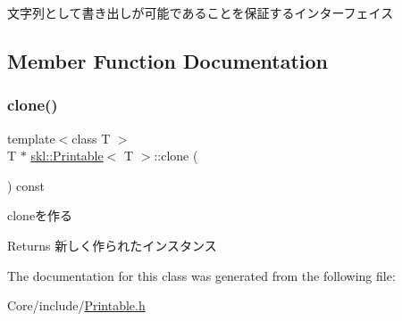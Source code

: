 文字列として書き出しが可能であることを保証するインターフェイス 

\subsection{Member Function Documentation}
\hypertarget{classskl_1_1_printable_a1bc18e234d25c4bdce84ed70a58d2f88}{}\label{classskl_1_1_printable_a1bc18e234d25c4bdce84ed70a58d2f88} 
\subsubsection{\texorpdfstring{clone()}{clone()}}
{\footnotesize\ttfamily template$<$class T $>$ \\
T $\ast$ \hyperlink{classskl_1_1_printable}{skl\+::\+Printable}$<$ T $>$\+::clone (\begin{DoxyParamCaption}{ }\end{DoxyParamCaption}) const}



cloneを作る 

\begin{DoxyReturn}{Returns}
新しく作られたインスタンス 
\end{DoxyReturn}


The documentation for this class was generated from the following file\+:\begin{DoxyCompactItemize}
\item 
Core/include/\hyperlink{_printable_8h}{Printable.\+h}\end{DoxyCompactItemize}
